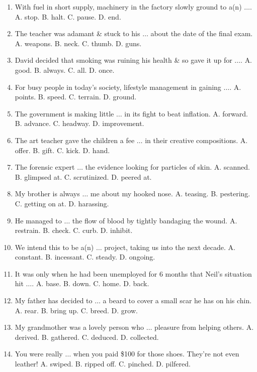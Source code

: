 \documentclass{article}
\numberwithin{equation}{section}
\begin{document}
\begin{enumerate}[leftmargin=8mm]
	\item With fuel in short supply, machinery in the factory slowly ground to a(n) $\ldots$. {\sf A.} stop. {\sf B.} halt. {\sf C.} pause. {\sf D.} end.
	\item The teacher was adamant \& stuck to his $\ldots$ about the date of the final exam. {\sf A.} weapons. {\sf B.} neck. {\sf C.} thumb. {\sf D.} guns.
	\item David decided that smoking was ruining his health \& so gave it up for $\ldots$. {\sf A.} good. {\sf B.} always. {\sf C.} all. {\sf D.} once.
	\item For busy people in today's society, lifestyle management in gaining $\ldots$. {\sf A.} points. {\sf B.} speed. {\sf C.} terrain. {\sf D.} ground.
	\item The government is making little $\ldots$ in its fight to beat inflation. {\sf A.} forward. {\sf B.} advance. {\sf C.} headway. {\sf D.} improvement.
	\item The art teacher gave the children a fee $\ldots$ in their creative compositions. {\sf A.} offer. {\sf B.} gift. {\sf C.} kick. {\sf D.} hand.
	\item The forensic expert $\ldots$ the evidence looking for particles of skin. {\sf A.} scanned. {\sf B.} glimpsed at. {\sf C.} scrutinized. {\sf D.} peered at.
	\item My brother is always $\ldots$ me about my hooked nose. {\sf A.} teasing. {\sf B.} pestering. {\sf C.} getting on at. {\sf D.} harassing.
	\item He managed to $\ldots$ the flow of blood by tightly bandaging the wound. {\sf A.} restrain. {\sf B.} check. {\sf C.} curb. {\sf D.} inhibit.
	\item We intend this to be a(n) $\ldots$ project, taking us into the next decade. {\sf A.} constant. {\sf B.} incessant. {\sf C.} steady. {\sf D.} ongoing.
	\item It was only when he had been unemployed for 6 months that Neil's situation hit $\ldots$. {\sf A.} base. {\sf B.} down. {\sf C.} home. {\sf D.} back.
	\item My father has decided to $\ldots$ a beard to cover a small scar he has on his chin. {\sf A.} rear. {\sf B.} bring up. {\sf C.} breed. {\sf D.} grow.
	\item My grandmother was a lovely person who $\ldots$ pleasure from helping others. {\sf A.} derived. {\sf B.} gathered. {\sf C.} deduced. {\sf D.} collected.
	\item You were really $\ldots$ when you paid \$100 for those shoes. They're not even leather! {\sf A.} swiped. {\sf B.} ripped off. {\sf C.} pinched. {\sf D.} pilfered.

\end{enumerate}
\end{document}
